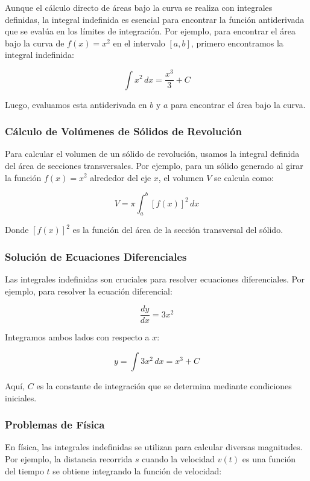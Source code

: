 Aunque el cálculo directo de áreas bajo la curva se realiza con integrales definidas, la integral indefinida es esencial para encontrar la función antiderivada que se evalúa en los límites de integración. Por ejemplo, para encontrar el área bajo la curva de \( f(x) = x^2 \) en el intervalo \([a, b]\), primero encontramos la integral indefinida:

\[
\int x^2 \, dx = \frac{x^3}{3} + C
\]

Luego, evaluamos esta antiderivada en \( b \) y \( a \) para encontrar el área bajo la curva.

\subsubsection{Cálculo de Volúmenes de Sólidos de Revolución}

Para calcular el volumen de un sólido de revolución, usamos la integral definida del área de secciones transversales. Por ejemplo, para un sólido generado al girar la función \( f(x) = x^2 \) alrededor del eje \( x \), el volumen \( V \) se calcula como:

\[
V = \pi \int_{a}^{b} \left[ f(x) \right]^2 \, dx
\]

Donde \( \left[ f(x) \right]^2 \) es la función del área de la sección transversal del sólido.

\subsubsection{Solución de Ecuaciones Diferenciales}

Las integrales indefinidas son cruciales para resolver ecuaciones diferenciales. Por ejemplo, para resolver la ecuación diferencial:

\[
\frac{dy}{dx} = 3x^2
\]

Integramos ambos lados con respecto a \( x \):

\[
y = \int 3x^2 \, dx = x^3 + C
\]

Aquí, \( C \) es la constante de integración que se determina mediante condiciones iniciales.

\subsubsection{Problemas de Física}

En física, las integrales indefinidas se utilizan para calcular diversas magnitudes. Por ejemplo, la distancia recorrida \( s \) cuando la velocidad \( v(t) \) es una función del tiempo \( t \) se obtiene integrando la función de velocidad:

